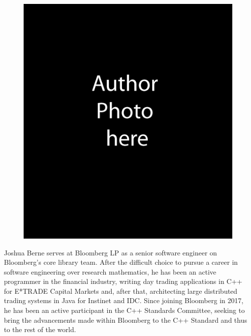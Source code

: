 \vspace*{18pt} %
\begin{figure}\includegraphics{cawp-authorphoto-JMB}\end{figure} \noindent Joshua Berne serves at Bloomberg LP as a senior software engineer on Bloomberg’s core library team. After the difficult choice to pursue a career in software engineering over research mathematics, he has been an active programmer in the financial industry, writing day trading applications in C++ for E*TRADE Capital Markets and, after that, architecting large distributed trading systems in Java for Instinet and IDC. Since joining Bloomberg in 2017, he has been an active participant in the C++ Standards Committee, seeking to bring the advancements made within Bloomberg to the C++ Standard and thus to the rest of the world. 

